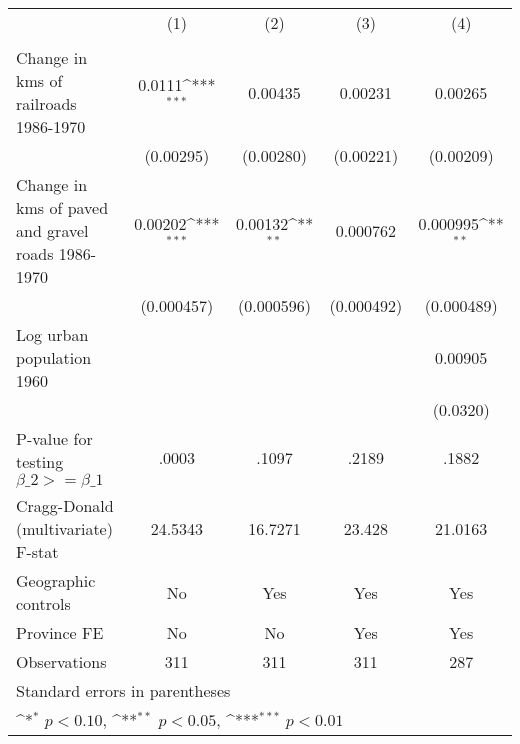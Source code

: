 {
\def\sym#1{\ifmmode^{#1}\else\(^{#1}\)\fi}
\begin{tabular}{l*{4}{c}}
\hline\hline
                &\multicolumn{1}{c}{(1)}&\multicolumn{1}{c}{(2)}&\multicolumn{1}{c}{(3)}&\multicolumn{1}{c}{(4)}\\
                &\multicolumn{1}{c}{}&\multicolumn{1}{c}{}&\multicolumn{1}{c}{}&\multicolumn{1}{c}{}\\
\hline
Change in kms of railroads 1986-1970&   0.0111\sym{***}&  0.00435         &  0.00231         &  0.00265         \\
                &(0.00295)         &(0.00280)         &(0.00221)         &(0.00209)         \\
[1em]
Change in kms of paved and gravel roads 1986-1970&  0.00202\sym{***}&  0.00132\sym{**} & 0.000762         & 0.000995\sym{**} \\
                &(0.000457)         &(0.000596)         &(0.000492)         &(0.000489)         \\
[1em]
Log urban population 1960&                  &                  &                  &  0.00905         \\
                &                  &                  &                  & (0.0320)         \\
\hline
P-value for testing $\beta\_{2} >= \beta\_{1}$&    .0003         &    .1097         &    .2189         &    .1882         \\
Cragg-Donald (multivariate) F-stat&  24.5343         &  16.7271         &   23.428         &  21.0163         \\
Geographic controls&       No         &      Yes         &      Yes         &      Yes         \\
Province FE     &       No         &       No         &      Yes         &      Yes         \\
Observations    &      311         &      311         &      311         &      287         \\
\hline\hline
\multicolumn{5}{l}{\footnotesize Standard errors in parentheses}\\
\multicolumn{5}{l}{\footnotesize \sym{*} \(p<0.10\), \sym{**} \(p<0.05\), \sym{***} \(p<0.01\)}\\
\end{tabular}
}
